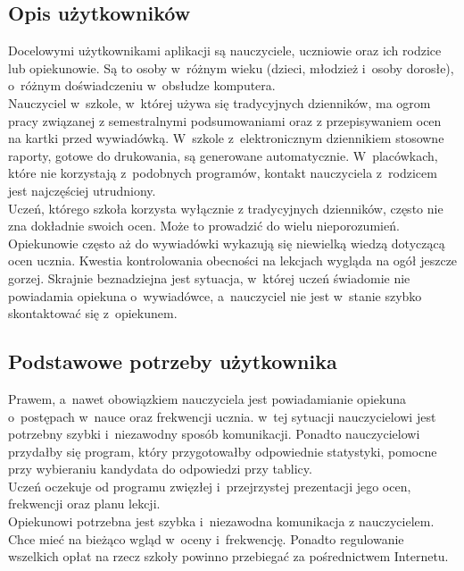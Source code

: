\documentclass[12pt,leqno,twoside]{mwart}
\begin{document}
\subsection{Opis użytkowników}
\noindent Docelowymi użytkownikami aplikacji są nauczyciele, uczniowie oraz ich rodzice lub opiekunowie. Są to osoby w~różnym wieku (dzieci, młodzież i~osoby dorosłe), o~różnym doświadczeniu w~obsłudze komputera.\\
\indent Nauczyciel w~szkole, w~której używa się tradycyjnych dzienników, ma ogrom pracy związanej z semestralnymi podsumowaniami oraz z przepisywaniem ocen na kartki przed wywiadówką. W~szkole z~elektronicznym dziennikiem stosowne raporty, gotowe do drukowania, są generowane automatycznie. W~placówkach, które nie korzystają z~podobnych programów, kontakt nauczyciela z~rodzicem jest najczęściej utrudniony.\\
\indent Uczeń, którego szkoła korzysta wyłącznie z tradycyjnych dzienników, często nie zna dokładnie swoich ocen. Może to prowadzić do wielu nieporozumień.\\
\indent Opiekunowie często aż do wywiadówki wykazują się niewielką wiedzą dotyczącą ocen ucznia. Kwestia kontrolowania obecności na lekcjach wygląda na ogół jeszcze gorzej. Skrajnie beznadziejna jest sytuacja, w~której uczeń świadomie nie powiadamia opiekuna o~wywiadówce, a~nauczyciel nie jest w~stanie szybko skontaktować się z~opiekunem.\\

\subsection{Podstawowe potrzeby użytkownika}
\noindent Prawem, a~nawet obowiązkiem nauczyciela jest powiadamianie opiekuna o~postępach w~nauce oraz frekwencji ucznia. w~tej sytuacji nauczycielowi jest potrzebny szybki i~niezawodny sposób komunikacji. Ponadto nauczycielowi przydałby się program, który przygotowałby odpowiednie statystyki, pomocne przy wybieraniu kandydata do odpowiedzi przy tablicy.\\
\indent Uczeń oczekuje od programu zwięzłej i~przejrzystej prezentacji jego ocen, frekwencji oraz planu lekcji.\\
\indent Opiekunowi potrzebna jest szybka i~niezawodna komunikacja z nauczycielem. Chce mieć na bieżąco wgląd w~oceny i~frekwencję. Ponadto regulowanie wszelkich opłat na rzecz szkoły powinno przebiegać za pośrednictwem Internetu.\\
\end{document}
